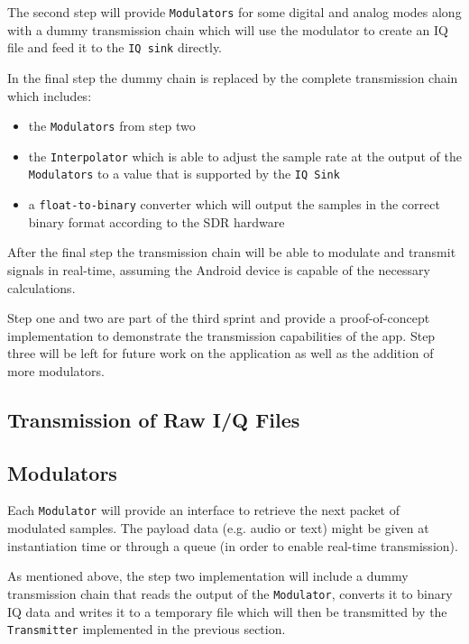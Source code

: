 The second step will provide \texttt{Modulators} for some digital and analog modes along
with a dummy transmission chain which will use the modulator to create an IQ
file and feed it to the \texttt{IQ sink} directly.

In the final step the dummy chain is replaced by the complete transmission chain
which includes:
\begin{itemize}
	\item the \texttt{Modulators} from step two
	\item the \texttt{Interpolator} which is able to adjust the sample rate at the 
		output of the \texttt{Modulators} to a value that is supported by the \texttt{IQ Sink}
	\item a \texttt{float-to-binary} converter which will output the samples in the correct
		binary format according to the \ac{SDR} hardware
\end{itemize}

After the final step the transmission chain will be able to modulate and transmit
signals in real-time, assuming the Android device is capable of the necessary
calculations.

Step one and two are part of the third sprint and provide a proof-of-concept
implementation to demonstrate the transmission capabilities of the app.
Step three will be left for future work on the application as well as the
addition of more modulators.


\subsection{Transmission of Raw I/Q Files}



\subsection{Modulators}

Each \texttt{Modulator} will provide an interface to retrieve the next packet of
modulated samples. The payload data (e.g. audio or text) might be given at
instantiation time or through a queue (in order to enable real-time transmission).

As mentioned above, the step two implementation will include a dummy transmission
chain that reads the output of the \texttt{Modulator}, converts it to binary IQ
data and writes it to a temporary file which will then be transmitted by the
\texttt{Transmitter} implemented in the previous section.


